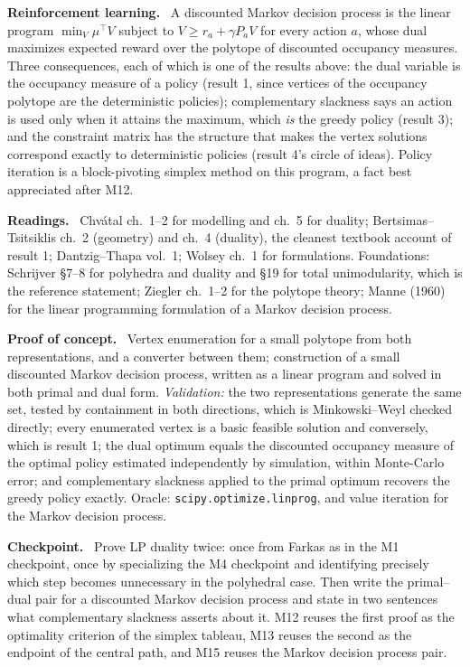 \documentclass[11pt,a4paper]{article}
\newcommand{\mpart}[1]{\smallskip\noindent\textbf{#1}\ \ignorespaces}
\begin{document}
\mpart{Reinforcement learning.} A discounted Markov decision process is the linear program
$\min_V \mu^\top V$ subject to $V \ge r_a+\gamma P_a V$ for every action $a$, whose dual
maximizes expected reward over the polytope of discounted occupancy measures. Three
consequences, each of which is one of the results above: the dual variable is the occupancy
measure of a policy (result 1, since vertices of the occupancy polytope are the deterministic
policies); complementary slackness says an action is used only when it attains the maximum,
which \emph{is} the greedy policy (result 3); and the constraint matrix has the structure that
makes the vertex solutions correspond exactly to deterministic policies (result 4's circle of
ideas). Policy iteration is a block-pivoting simplex method on this program, a fact best
appreciated after M12.

\mpart{Readings.} Chv\'atal ch.~1--2 for modelling and ch.~5 for duality;
Bertsimas--Tsitsiklis ch.~2 (geometry) and ch.~4 (duality), the cleanest textbook account of
result 1; Dantzig--Thapa vol.~1; Wolsey ch.~1 for formulations. Foundations: Schrijver
\S 7--8 for polyhedra and duality and \S 19 for total unimodularity, which is the reference
statement; Ziegler ch.~1--2 for the polytope theory; Manne (1960) for the linear programming
formulation of a Markov decision process.

\mpart{Proof of concept.} Vertex enumeration for a small polytope from both representations,
and a converter between them; construction of a small discounted Markov decision process,
written as a linear program and solved in both primal and dual form.
\emph{Validation:} the two representations generate the same set, tested by containment in
both directions, which is Minkowski--Weyl checked directly; every enumerated vertex is a basic
feasible solution and conversely, which is result 1; the dual optimum equals the discounted
occupancy measure of the optimal policy estimated independently by simulation, within
Monte-Carlo error; and complementary slackness applied to the primal optimum recovers the
greedy policy exactly. Oracle: \texttt{scipy.optimize.linprog}, and value iteration for the
Markov decision process.

\mpart{Checkpoint.} Prove LP duality twice: once from Farkas as in the M1 checkpoint, once by
specializing the M4 checkpoint and identifying precisely which step becomes unnecessary in the
polyhedral case. Then write the primal--dual pair for a discounted Markov decision process and
state in two sentences what complementary slackness asserts about it. M12 reuses the first
proof as the optimality criterion of the simplex tableau, M13 reuses the second as the
endpoint of the central path, and M15 reuses the Markov decision process pair.
\end{document}
